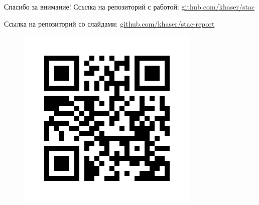 \documentclass[10pt,aspectratio=169,hyperref={pdftex,unicode},xcolor=dvipsnames]{beamer}
\begin{document}
\begin{frame}{ Спасибо за внимание! }
    Ссылка на репозиторий с работой: \href{https://github.com/khaser/stac}{github.com/khaser/stac}

    Ссылка на репозиторий со слайдами: \href{https://github.com/khaser/stac}{github.com/khaser/stac-report}

    \begin{figure}
        \centering
        \includegraphics[height=0.8\textheight,keepaspectratio]{./images/stac_qr.png}
    \end{figure}
\end{frame}

%
%
%
%
\end{document}
